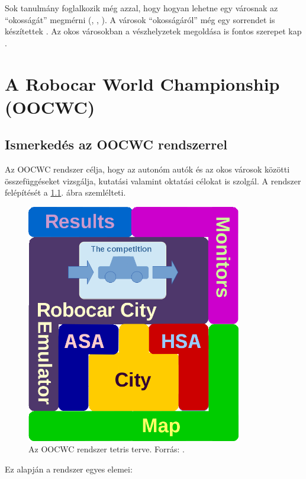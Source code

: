 \documentclass[a4paper,12pt]{report}
\begin{document}
\vspace{2mm}
Sok tanulmány foglalkozik még azzal, hogy hogyan lehetne egy városnak az ``okosságát'' megmérni (\cite{de2014smart}, \cite{carli2013measuring}, \cite{neirotti2014current}). A városok ``okosságáról'' még egy sorrendet is készítettek \cite{giffinger2007smart}. Az okos városokban a vészhelyzetek megoldása is fontos szerepet kap \cite{du2012research}.

\chapter{A Robocar World Championship (OOCWC)}
\label{oocwc}

\section{Ismerkedés az OOCWC rendszerrel}

Az OOCWC rendszer célja, hogy az autonóm autók és az okos városok közötti összefüggéseket vizsgálja, kutatási valamint oktatási célokat is szolgál. A rendszer felépítését a \ref{basedesign}. ábra szemlélteti.

\begin{figure}[h]
\centerline{
\includegraphics[width=3.7in]{img/tetris_plan}}
\caption{Az OOCWC rendszer tetris terve. Forrás: \cite{oocwcrepo}.}
\label{basedesign}
\end{figure}

Ez alapján a rendszer egyes elemei:
\end{document}
